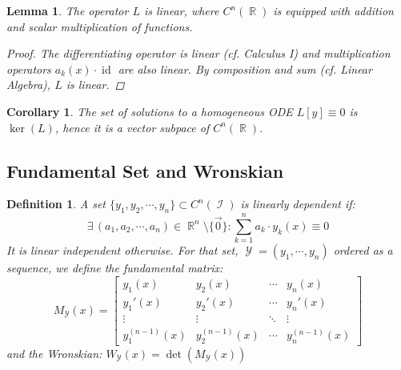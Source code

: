 \documentclass[12pt]{article}
\newcommand{\Exist}[1]{\exists\,{#1}:}
\DeclareMathOperator{\R}{\mathbb{R}}
\DeclareMathOperator{\I}{\mathcal{I}}
\DeclareMathOperator{\Y}{\mathcal{Y}}
\DeclareMathOperator{\id}{id}
\newcommand{\der}[2][n]{{#2}^{(#1)}}
\newtheorem{definition}[theorem]{Definition}
\newtheorem{lemma}[theorem]{Lemma}
\newtheorem{corollary}[theorem]{Corollary}
\begin{document}
\begin{lemma}
  The operator $L$ is linear, where $C^n(\R)$ is equipped with addition and scalar multiplication of functions.
  \begin{proof}
    The differentiating operator is linear (cf. Calculus I) and multiplication operators $a_k(x)\cdot\id$ are also linear. By composition and sum (cf. Linear Algebra), $L$ is linear.
  \end{proof}
\end{lemma}

\begin{corollary}
  The set of solutions to a homogeneous ODE $L[y]\equiv 0$ is $\ker(L)$, hence it is a vector subpace of $C^n(\R)$.
\end{corollary}

\pagebreak

\subsection{Fundamental Set and Wronskian}

\begin{definition}
  \label{def_fundamental}
  A set $\{y_1,y_2,\cdots,y_n\}\subset C^n(\I)$ is linearly dependent if: $$\Exist{(a_1,a_2,\cdots,a_n)\in\R^n\setminus\{\vec{0}\}}\sum_{k=1}^n a_k\cdot y_k(x)\equiv 0$$ It is linear independent otherwise. For that set, $\Y=(y_1,\cdots,y_n)$ ordered as a sequence, we define the fundamental matrix: $$M_{\Y}(x)=\begin{bmatrix}
    y_1(x)&y_2(x)&\cdots&y_n(x)\\
    y_1'(x)&y_2'(x)&\cdots&y_n'(x)\\
    \vdots&\vdots&\ddots&\vdots\\
    \der[n-1]{y}_1(x)&\der[n-1]{y}_2(x)&\cdots&\der[n-1]{y}_n(x)
  \end{bmatrix}$$ and the Wronskian: $W_{\Y}(x)=\det(M_{\Y}(x))$
\end{definition}
\end{document}
